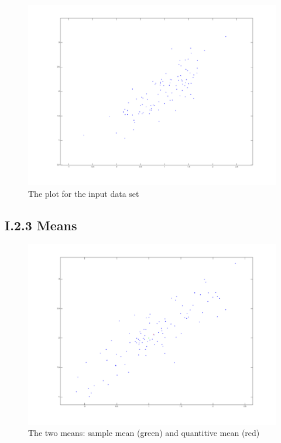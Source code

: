 \documentclass{article}      %
\begin{document}
\begin{figure}[ht]
\centering
\includegraphics[scale=.3]{img/i22}

\caption{The plot for the input data set \label{overflow}}
\end{figure}

\subsection*{I.2.3 Means}

\begin{figure}[ht]
\centering
\includegraphics[scale=.3]{img/i23}
\caption{The two means: sample mean (green) and quantitive mean (red) \label{overflow}}
\end{figure}
\end{document}
